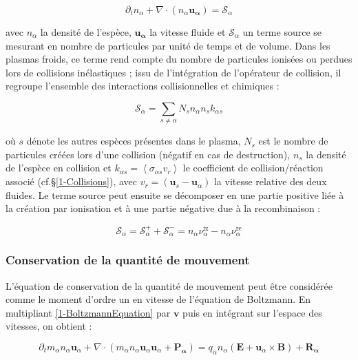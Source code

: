 \begin{refsection}
\begin{equation}
\label{1-eqContinuite}
	\partial_tn_\alpha+
	\nabla\cdot\left(n_\alpha\mathbf{u_\alpha}\right)=\mathcal{S}_\alpha
\end{equation}

avec $n_\alpha$ la densité de l'espèce, $\mathbf{u_\alpha}$ la vitesse
fluide et $\mathcal{S}_\alpha$ un terme source se mesurant en
nombre de particules par unité de temps et de volume. Dans
les plasmas froids, ce terme rend compte
du nombre de particules ionisées ou perdues lors de collisions inélastiques ;
issu de l'intégration de l'opérateur de collision, il regroupe
l'ensemble des interactions collisionnelles et chimiques :

\begin{equation}
	\mathcal{S}_\alpha=\sum_{s\neq\alpha} N_s n_{\alpha}n_{s}
	k_{\alpha s}
\end{equation} 

où $s$ dénote les
autres espèces présentes dans le plasma, $N_s$ est le nombre de particules
créées lors d'une collision (négatif en cas de destruction), $n_s$ la densité de
l'espèce en collision et $k_{\alpha s}=\left<\sigma_{\alpha s} v_r\right>$ le
coefficient de collision/réaction associé (cf.\S\ref{1-Collisions}), avec
$v_r=(\mathbf u_s-\mathbf u_\alpha)$ la vitesse relative des deux fluides. Le
terme source peut ensuite se décomposer en une partie positive liée à la
création par ionisation et à une partie négative due à la recombinaison :

\begin{equation}
	\mathcal{S}_\alpha=\mathcal{S}_\alpha^++\mathcal{S}_\alpha^-=n_{\alpha}\nu_\alpha^\text{iz}-n_{\alpha}\nu_\alpha^\text{re}
\end{equation} 


\subsubsection{Conservation de la quantité de mouvement}
L'équation de conservation de la quantité de mouvement peut être considérée
comme le moment d'ordre un en vitesse de l'équation de Boltzmann. En multipliant
\eqref{1-BoltzmannEquation} par $\mathbf v$ puis en intégrant sur l'espace des
vitesses, on obtient :

\begin{equation}
\label{1-eqQuantiteMouvement}
\partial_t m_\alpha n_\alpha \mathbf{u}_\alpha + 
\nabla\cdot\left(m_\alpha n_\alpha
\mathbf{u}_\alpha\mathbf{u}_\alpha+\mathbf{P_\alpha}\right)=q_\alpha
n_\alpha\left(\mathbf E+\mathbf u_\alpha\times\mathbf B\right)
+\mathbf{R_\alpha}
\end{equation}


\end{refsection}
